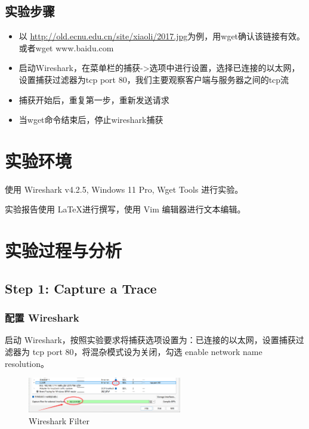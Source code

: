 \documentclass[14pt,a4paper,UTF8,twoside]{article}
\begin{document}
\subsection{实验步骤}

\begin{itemize}
    \item 以 \href{http://old.ecnu.edu.cn/site/xiaoli/2017.jpg}{\underline{http://old.ecnu.edu.cn/site/xiaoli/2017.jpg}}为例，用wget确认该链接有效。或者wget www.baidu.com
    \item 启动Wireshark，在菜单栏的捕获->选项中进行设置，选择已连接的以太网，设置捕获过滤器为tcp port 80，我们主要观察客户端与服务器之间的tcp流
    \item 捕获开始后，重复第一步，重新发送请求
    \item 当wget命令结束后，停止wireshark捕获
\end{itemize}

\section{实验环境}

使用 Wireshark v4.2.5, Windows 11 Pro, Wget Tools 进行实验。

实验报告使用 \LaTeX 进行撰写，使用 Vim 编辑器进行文本编辑。

\section{实验过程与分析}

\subsection{Step 1: Capture a Trace}

\subsubsection{配置 Wireshark}

启动 Wireshark，按照实验要求将捕获选项设置为：已连接的以太网，设置捕获过滤器为 tcp port 80，将混杂模式设为关闭，勾选 enable network name resolution。

\begin{figure}[H]
  \centering
  \includegraphics[width=0.6\textwidth]{lab3/fitler.jpg}
  \caption{Wireshark Filter}
\end{figure}
\end{document}
